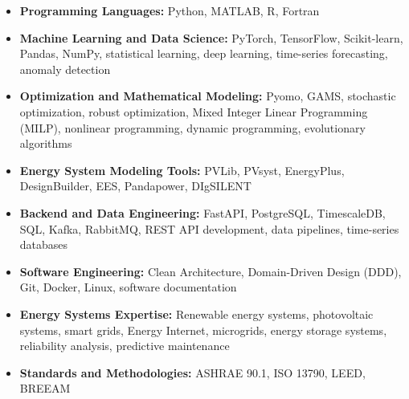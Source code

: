 \documentclass[letter,20pt]{article}
\begin{document}
\begin{itemize}
[
noitemsep,
topsep=5pt,
leftmargin=3ex
]


\item
\textbf{Programming Languages:}
Python, MATLAB, R, Fortran


\vspace{4pt}


\item
\textbf{Machine Learning and Data Science:}
PyTorch, TensorFlow, Scikit-learn, Pandas, NumPy, statistical learning, deep learning, time-series forecasting, anomaly detection



\vspace{4pt}


\item
\textbf{Optimization and Mathematical Modeling:}
Pyomo, GAMS, stochastic optimization, robust optimization, Mixed Integer Linear Programming (MILP), nonlinear programming, dynamic programming, evolutionary algorithms



\vspace{4pt}


\item
\textbf{Energy System Modeling Tools:}
PVLib, PVsyst, EnergyPlus, DesignBuilder, EES, Pandapower, DIgSILENT



\vspace{4pt}


\item
\textbf{Backend and Data Engineering:}
FastAPI, PostgreSQL, TimescaleDB, SQL, Kafka, RabbitMQ, REST API development, data pipelines, time-series databases



\vspace{4pt}


\item
\textbf{Software Engineering:}
Clean Architecture, Domain-Driven Design (DDD), Git, Docker, Linux, software documentation



\vspace{4pt}


\item
\textbf{Energy Systems Expertise:}
Renewable energy systems, photovoltaic systems, smart grids, Energy Internet, microgrids, energy storage systems, reliability analysis, predictive maintenance



\vspace{4pt}


\item
\textbf{Standards and Methodologies:}
ASHRAE 90.1, ISO 13790, LEED, BREEAM


\end{itemize}
\end{document}
